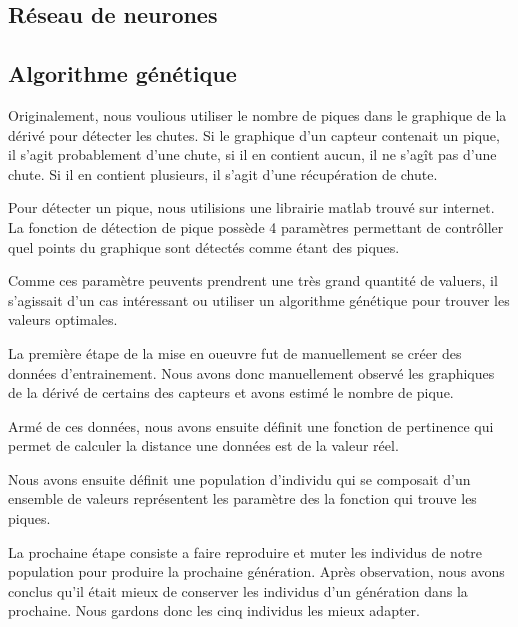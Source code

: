 \documentclass[12pt,letterpaper]{article}
\begin{document}
\subsection{Réseau de neurones} %

\subsection{Algorithme génétique}

Originalement, nous voulious utiliser le nombre de piques dans le graphique de la dérivé pour détecter les chutes.
Si le graphique d'un capteur contenait un pique, il s'agit probablement d'une chute, si il en contient aucun, il
ne s'agît pas d'une chute. Si il en contient plusieurs, il s'agit d'une récupération de chute.

Pour détecter un pique, nous utilisions une librairie matlab trouvé sur internet. La fonction de détection de pique
possède 4 paramètres permettant de contrôller quel points du graphique sont détectés comme étant des piques.

Comme ces paramètre peuvents prendrent une très grand quantité de valuers, il s'agissait d'un cas intéressant ou utiliser
un algorithme génétique pour trouver les valeurs optimales.

La première étape de la mise en oueuvre fut de manuellement se créer des données d'entrainement. Nous avons donc manuellement
observé les graphiques de la dérivé de certains des capteurs et avons estimé le nombre de pique.

Armé de ces données, nous avons ensuite définit une fonction de pertinence qui permet de calculer la distance une données est de
la valeur réel.

Nous avons ensuite définit une population d'individu qui se composait d'un ensemble de valeurs représentent les paramètre des la
fonction qui trouve les piques.

La prochaine étape consiste a faire reproduire et muter les individus de notre population pour produire la prochaine génération. Après
observation, nous avons conclus qu'il était mieux de conserver les individus d'un génération dans la prochaine. Nous gardons donc les
cinq individus les mieux adapter.
\end{document}
